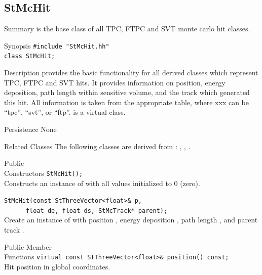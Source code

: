\subsection{StMcHit}
 
\label{sec:StMcHit}
\begin{Entry}
\item[Summary]
     is the base class of all TPC, FTPC and SVT monte carlo hit classes.

\item[Synopsis]
    \verb+#include "StMcHit.hh"+\\
    \verb+class StMcHit;+\\

\item[Description]
     provides the basic functionality for all derived classes
    which represent TPC, FTPC and SVT hits. It provides information on
    position, energy deposition,  path length within sensitive volume, and the track which
    generated this hit.  All information is taken from
    the appropriate  table, where xxx can be ``tpc'', ``svt'',
    or ``ftp''.
     is a virtual class.

\item[Persistence]
    None

\item[Related Classes]
    The following classes are derived from :
    , , .
    
\item[Public\\ Constructors]
    \verb+StMcHit();+\\
    Constructs an instance of  with all values initialized
    to 0 (zero).

    \verb+StMcHit(const StThreeVector<float>& p,+\\
    \verb+      float de, float ds, StMcTrack* parent);+\\
    
    Create an instance of  with position ,
    energy deposition , path length , and parent track .

\item[Public Member\\ Functions]
    \verb+virtual const StThreeVector<float>& position() const;+\\
    Hit position in global coordinates.


\end{Entry}
